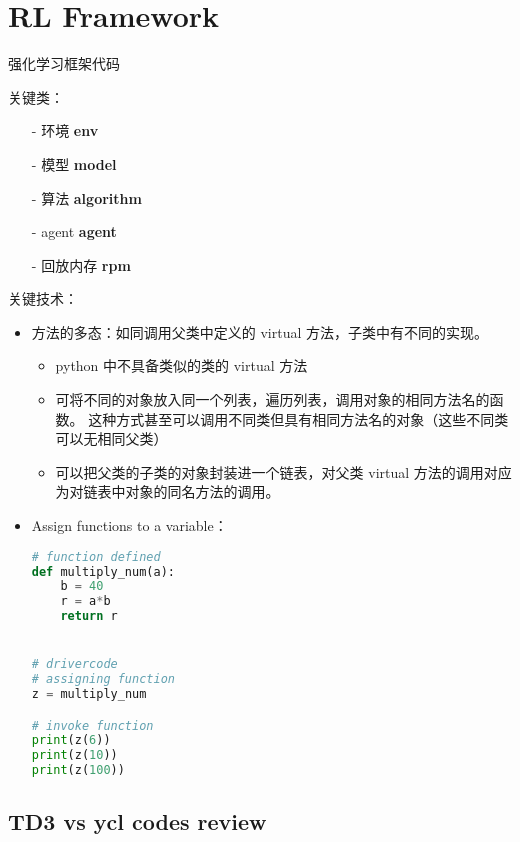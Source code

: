 \chapter{RL Framework}

强化学习框架代码

关键类：
\begin{itemize}
\item[-]
环境 {\bf env}

\item[-]
模型 {\bf model}

\item[-]
算法 {\bf algorithm}

\item[-]
agent {\bf agent}

\item[-]
回放内存 {\bf rpm}
\end{itemize}


关键技术：
\begin{itemize}
\item
方法的多态：如同调用父类中定义的 virtual 方法，子类中有不同的实现。
	\begin{itemize}
	\item
	python 中不具备类似的类的 virtual 方法

	\item
	可将不同的对象放入同一个列表，遍历列表，调用对象的相同方法名的函数。
	这种方式甚至可以调用不同类但具有相同方法名的对象（这些不同类可以无相同父类）

	\item
	可以把父类的子类的对象封装进一个链表，对父类 virtual 方法的调用对应为对链表中对象的同名方法的调用。
	\end{itemize}

\item
Assign functions to a variable：
\begin{lstlisting}[language=Python]
# function defined
def multiply_num(a):
	b = 40
	r = a*b
	return r


# drivercode
# assigning function
z = multiply_num

# invoke function
print(z(6))
print(z(10))
print(z(100))
\end{lstlisting}

\end{itemize}


\section{TD3 vs ycl codes review}


